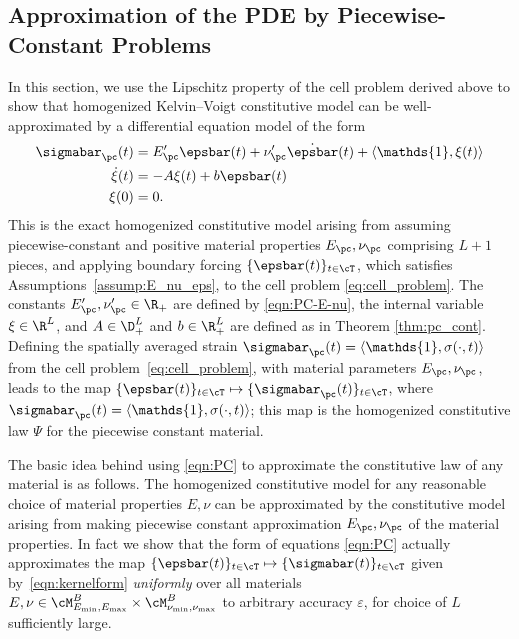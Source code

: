 \documentclass[letterpaper,11pt]{article}
\begin{document}
\subsection{Approximation of the PDE by Piecewise-Constant Problems}
\label{ssec:4.2}
In this section, we use the Lipschitz property of the cell problem derived above to show that  homogenized Kelvin--Voigt constitutive model can be well-approximated by a differential equation model of the form
\begin{subequations}\label{eqn:PC}
\begin{align}
    \sigmabar_{\pc}(t) &= E'_{\pc}\epsbar(t) + \nu'_{\pc}\dot{\epsbar}(t) + \langle \mathds{1}, \xi(t) \rangle\\
    \dot{\xi}(t) & = -A \xi(t) + b\epsbar(t)  \\
    \xi(0) & = 0.
\end{align}
\end{subequations}
This is the exact homogenized constitutive model arising from assuming piecewise-constant and positive material properties $E_{\pc}, \nu_{\pc}$ comprising $L+1$ pieces, and applying boundary forcing $\{\epsbar(t)\}_{t\in \cT}$, which satisfies Assumptions~\ref{assump:E_nu_eps}, to the cell problem \eqref{eq:cell_problem}. The constants $E'_{\pc}, \nu'_{\pc} \in \R_+$ are defined by \eqref{eqn:PC-E-nu}, the internal variable $\xi \in \R^L$, and $A \in \D_+^L$ and $b \in \R_+^L$ are defined as in Theorem \ref{thm:pc_cont}. Defining the spatially averaged strain $\sigmabar_{\pc}(t) = \langle \mathds{1}, \sigma(\cdot, t)\rangle$ from the cell problem~\eqref{eq:cell_problem}, with material parameters $E_{\pc}, \nu_{\pc}$, leads to the map $\{\epsbar(t)\}_{t\in \cT} \mapsto \{\sigmabar_{\pc}(t)\}_{t \in \cT}$, where $\sigmabar_{\pc}(t) = \langle \mathds{1}, \sigma(\cdot, t)\rangle$; this map is the homogenized constitutive law $\Psi$ for the piecewise constant material.

The basic idea behind using \eqref{eqn:PC} to approximate the constitutive law
of any material is as follows. The homogenized constitutive model for any reasonable choice of material properties $E,\nu$ can be approximated by the constitutive model arising from making piecewise constant approximation $E_{\pc}, \nu_{\pc}$ of the material properties. In fact we show that the form of equations \eqref{eqn:PC} actually approximates the map $\{\epsbar(t)\}_{t\in \cT} \mapsto \{\sigmabar(t)\}_{t \in \cT}$ given by~\eqref{eqn:kernelform} \textit{uniformly} over all materials $E, \nu \in \cM_{E_{\min}, E_{\max}}^B \times \cM_{\nu_{\min}, \nu_{\max}}^B$ to arbitrary accuracy $\varepsilon$, for choice of $L$ sufficiently large.
\end{document}
